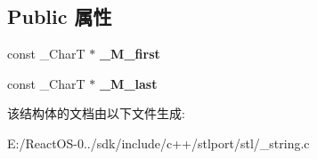 \subsection*{Public 属性}
\begin{DoxyCompactItemize}
\item 
\mbox{\label{struct___not__within__traits_a15fb99b7068c345d3ca46dfca5cc05dc}} 
const \+\_\+\+CharT $\ast$ {\bfseries \+\_\+\+M\+\_\+first}
\item 
\mbox{\label{struct___not__within__traits_abc254aa16ae45772495b8ec2e9ba6a52}} 
const \+\_\+\+CharT $\ast$ {\bfseries \+\_\+\+M\+\_\+last}
\end{DoxyCompactItemize}


该结构体的文档由以下文件生成\+:\begin{DoxyCompactItemize}
\item 
E\+:/\+React\+O\+S-\/0../sdk/include/c++/stlport/stl/\+\_\+string.\+c\end{DoxyCompactItemize}
